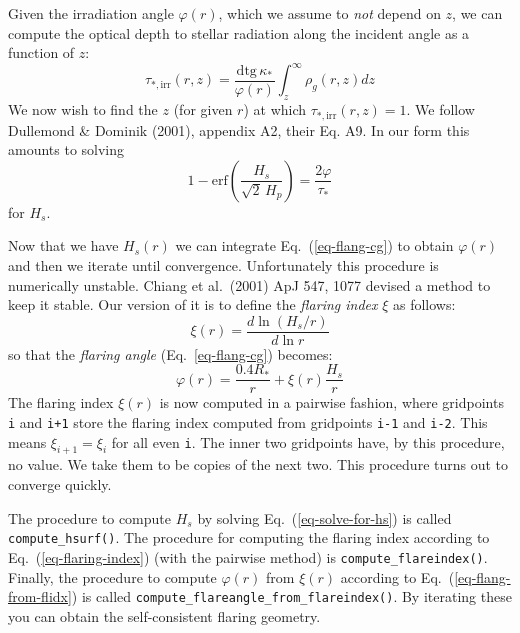 \documentclass{book}
\newcommand{\code}[1]{{\small\tt #1}}
\begin{document}
Given the irradiation angle $\varphi(r)$, which we assume to {\em not} depend
on $z$, we can compute the optical depth to stellar radiation along the incident
angle as a function of $z$:
\begin{equation}
  \tau_{*,\mathrm{irr}}(r,z) = \frac{\mathrm{dtg}\,\kappa_{*}}{\varphi(r)}
  \int_z^\infty \rho_g(r,z)dz
\end{equation}
We now wish to find the $z$ (for given $r$) at which $\tau_{*,\mathrm{irr}}(r,z)= 1$.
We follow Dullemond \& Dominik (2001), appendix A2, their Eq. A9. In
our form this amounts to solving
\begin{equation}\label{eq-solve-for-hs}
1-\mathrm{erf}\left(\frac{H_s}{\sqrt{2}\,H_p}\right) = \frac{2\varphi}{\tau_{*}}
\end{equation}
for $H_s$.

Now that we have $H_s(r)$ we can integrate Eq.~(\ref{eq-flang-cg}) to obtain
$\varphi(r)$ and then we iterate until convergence. Unfortunately this
procedure is numerically unstable. Chiang et al.~(2001) ApJ 547, 1077
devised a method to keep it stable. Our version of it is to define the
{\em flaring index} $\xi$ as follows:
\begin{equation}\label{eq-flaring-index}
\xi(r) = \frac{d\ln(H_s/r)}{d\ln r}
\end{equation}
so that the {\em flaring angle} (Eq.~\ref{eq-flang-cg}) becomes:
\begin{equation}\label{eq-flang-from-flidx}
\varphi(r) = \frac{0.4 R_{*}}{r} + \xi(r)\frac{H_s}{r}
\end{equation}
The flaring index $\xi(r)$ is now computed in a pairwise fashion,
where gridpoints \code{i} and \code{i+1} store the flaring index
computed from gridpoints \code{i-1} and \code{i-2}. This means
$\xi_{i+1}=\xi_{i}$ for all even \code{i}. The inner two gridpoints
have, by this procedure, no value. We take them to be copies of
the next two. This procedure turns out to converge quickly.

The procedure to compute $H_s$ by solving Eq.~(\ref{eq-solve-for-hs})
is called \code{compute\_hsurf()}. The procedure for computing
the flaring index according to Eq.~(\ref{eq-flaring-index}) (with
the pairwise method) is \code{compute\_flareindex()}. Finally,
the procedure to compute $\varphi(r)$ from $\xi(r)$ according
to Eq.~(\ref{eq-flang-from-flidx}) is called
\code{compute\_flareangle\_from\_flareindex()}. By iterating
these you can obtain the self-consistent flaring geometry.
\end{document}
